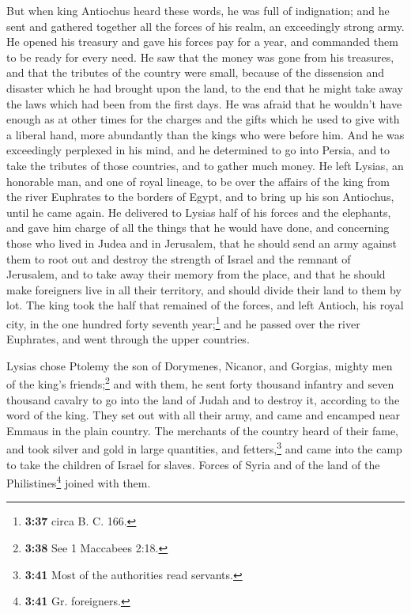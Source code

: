  But when king Antiochus heard these words, he was full
of indignation; and he sent and gathered together all the forces of his
realm, an exceedingly strong army.  He opened his
treasury and gave his forces pay for a year, and commanded them to be
ready for every need.  He saw that the money was gone
from his treasures, and that the tributes of the country were small,
because of the dissension and disaster which he had brought upon the
land, to the end that he might take away the laws which had been from
the first days.  He was afraid that he wouldn't have
enough as at other times for the charges and the gifts which he used to
give with a liberal hand, more abundantly than the kings who were before
him.  And he was exceedingly perplexed in his mind, and
he determined to go into Persia, and to take the tributes of those
countries, and to gather much money.  He left Lysias, an
honorable man, and one of royal lineage, to be over the affairs of the
king from the river Euphrates to the borders of Egypt, 
and to bring up his son Antiochus, until he came again. 
He delivered to Lysias half of his forces and the elephants, and gave
him charge of all the things that he would have done, and concerning
those who lived in Judea and in Jerusalem,  that he
should send an army against them to root out and destroy the strength of
Israel and the remnant of Jerusalem, and to take away their memory from
the place,  and that he should make foreigners live in
all their territory, and should divide their land to them by lot.
 The king took the half that remained of the forces, and
left Antioch, his royal city, in the one hundred forty seventh
year;\footnote{\textbf{3:37} circa B. C. 166.} and he passed over the
river Euphrates, and went through the upper countries.

 Lysias chose Ptolemy the son of Dorymenes, Nicanor, and
Gorgias, mighty men of the king's friends;\footnote{\textbf{3:38} See 1
  Maccabees 2:18.}  and with them, he sent forty thousand
infantry and seven thousand cavalry to go into the land of Judah and to
destroy it, according to the word of the king.  They set
out with all their army, and came and encamped near Emmaus in the plain
country.  The merchants of the country heard of their
fame, and took silver and gold in large quantities, and
fetters,\footnote{\textbf{3:41} Most of the authorities read servants.}
and came into the camp to take the children of Israel for slaves. Forces
of Syria and of the land of the Philistines\footnote{\textbf{3:41} Gr.
  foreigners.} joined with them.

